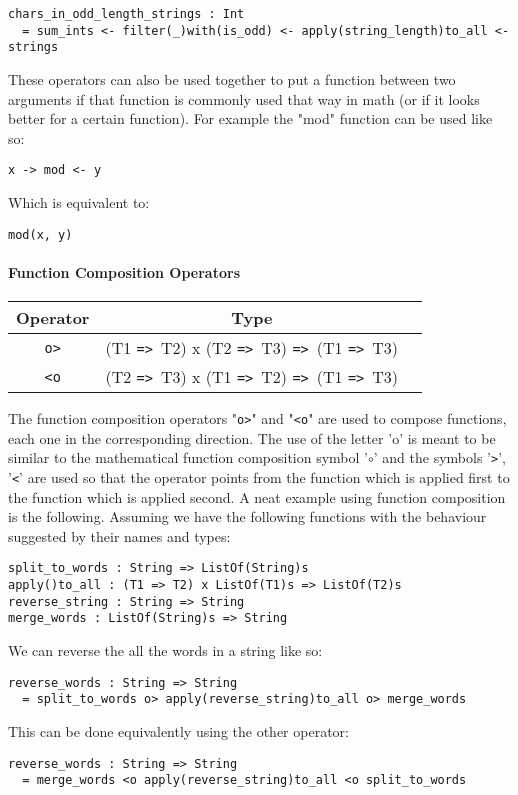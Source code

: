 \documentclass{article}
\def\ra{\texttt{=>}\ }
\begin{document}
\begin{verbatim}
chars_in_odd_length_strings : Int
  = sum_ints <- filter(_)with(is_odd) <- apply(string_length)to_all <- strings

\end{verbatim}
These operators can also be used together to put a function between two arguments
if that function is commonly used that way in math (or if it looks better for a
certain function). For example the "mod" function can be used like so:
\begin{center}
\texttt{x -> mod <- y}
\end{center}
Which is equivalent to:
\begin{center}
\texttt{mod(x, y)}
\end{center}

\paragraph{Function Composition Operators}
\begin{center}
\begin{tabular}{ |c|c|c| } 
\hline
Operator & Type \\ 
\hline
\hline
\texttt{o>} & (T1 \ra T2) x (T2 \ra T3) \ra (T1 \ra T3) \\
\hline
\texttt{<o} & (T2 \ra T3) x (T1 \ra T2) \ra (T1 \ra T3) \\
\hline
\end{tabular}
\end{center}
The function composition operators "\texttt{o>}" and "\texttt{<o}" are used to 
compose functions, each one in the corresponding direction. The use of the letter 'o'
is meant to be similar to the mathematical function composition symbol '\(\circ\)'
and the symbols '\texttt{>}', '\texttt{<}' are used so that the operator points from
the function which is applied first to the function which is applied second.
A neat example using function composition is the following. Assuming we have the
following functions with the behaviour suggested by their names and types: 
\begin{verbatim}
split_to_words : String => ListOf(String)s
apply()to_all : (T1 => T2) x ListOf(T1)s => ListOf(T2)s
reverse_string : String => String
merge_words : ListOf(String)s => String
\end{verbatim}
We can reverse the all the words in a string like so:
\begin{verbatim}
reverse_words : String => String
  = split_to_words o> apply(reverse_string)to_all o> merge_words
\end{verbatim}
This can be done equivalently using the other operator:
\begin{verbatim}
reverse_words : String => String
  = merge_words <o apply(reverse_string)to_all <o split_to_words
\end{verbatim}
\end{document}

